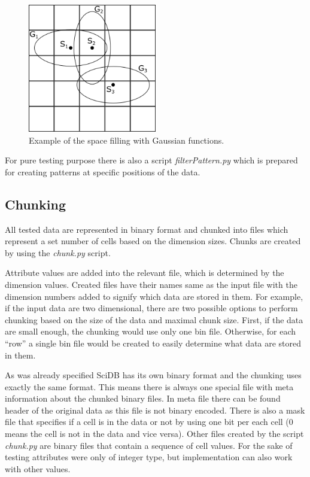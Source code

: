 \begin{figure}
\centering
\includegraphics[width=0.5\textwidth]{gauss}
\caption{Example of the space filling with Gaussian functions. \cite{mdApproxPM}}
\label{gauss}
\end{figure}

For pure testing purpose there is also a script \textit{filterPattern.py} which is prepared for creating patterns at specific positions of the data.

\subsection{Chunking}\label{chunking}
All tested data are represented in binary format and chunked into files which represent a set number of cells based on the dimension sizes. Chunks are created by using the \textit{chunk.py} script.

Attribute values are added into the relevant file, which is determined by the dimension values. Created files have their names same as the input file with the dimension numbers added to signify which data are stored in them. For example, if the input data are two dimensional, there are two possible options to perform chunking based on the size of the data and maximal chunk size. First, if the data are small enough, the chunking would use only one bin file. Otherwise, for each ``row'' a single bin file would be created to easily determine what data are stored in them.

As was already specified SciDB has its own binary format and the chunking uses exactly the same format. This means there is always one special file with meta information about the chunked binary files. In meta file there can be found header of the original data as this file is not binary encoded. There is also a mask file that specifies if a cell is in the data or not by using one bit per each cell (0 means the cell is not in the data and vice versa). Other files created by the script \textit{chunk.py} are binary files that contain a sequence of cell values. For the sake of testing attributes were only of integer type, but implementation can also work with other values.

